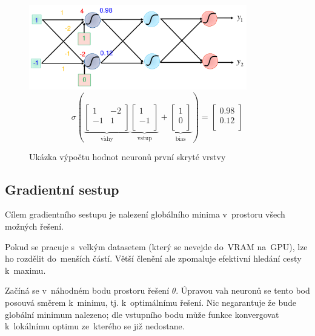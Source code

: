 \begin{figure}[ht]
    \onehalfspacing
    \centering
    \includegraphics[height=10em]{images/6_maticova-operace}
    $$
    \sigma \left(
    \underbrace{
        \left[ \begin{matrix}
        1 & -2 \\
        -1 & 1 \\
        \end{matrix} \right]
    }_{\mathrm{v\acute{a}hy}}
    \underbrace{
        \left[ \begin{matrix}
        1 \\
        -1 \\
        \end{matrix} \right]
    }_{\mathrm{vstup}} +
    \underbrace{
        \left[ \begin{matrix}
        1 \\
        0 \\
        \end{matrix} \right]
    }_{\mathrm{bias}}
    \right) = \left[ \begin{matrix}
    0.98 \\
    0.12 \\
    \end{matrix} \right]
    $$
    \caption{Ukázka výpočtu hodnot neuronů první skryté vrstvy}
\end{figure}
\FloatBarrier

\subsection{Gradientní sestup}

Cílem gradientního sestupu je nalezení globálního minima v~prostoru všech možných řešení.

Pokud se pracuje s~velkým datasetem (který se nevejde do~VRAM na~GPU), lze ho rozdělit do~menších částí.
Větší členění ale zpomaluje efektivní hledání cesty k~maximu.

Začíná se v~náhodném bodu prostoru řešení $\theta$.
Úpravou vah neuronů se tento bod posouvá směrem k~minimu, tj. k~optimálnímu řešení.
Nic negarantuje že bude globální minimum nalezeno; dle vstupního bodu může funkce konvergovat k~lokálnímu optimu ze~kterého se již nedostane.

